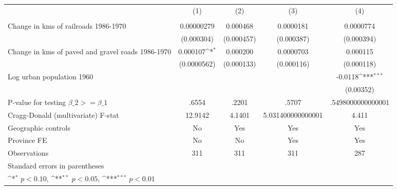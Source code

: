 {
\def\sym#1{\ifmmode^{#1}\else\(^{#1}\)\fi}
\begin{tabular}{l*{4}{c}}
\hline\hline
                &\multicolumn{1}{c}{(1)}&\multicolumn{1}{c}{(2)}&\multicolumn{1}{c}{(3)}&\multicolumn{1}{c}{(4)}\\
                &\multicolumn{1}{c}{}&\multicolumn{1}{c}{}&\multicolumn{1}{c}{}&\multicolumn{1}{c}{}\\
\hline
Change in kms of railroads 1986-1970&0.00000279         & 0.000468         &0.0000181         &0.0000774         \\
                &(0.000304)         &(0.000457)         &(0.000387)         &(0.000394)         \\
[1em]
Change in kms of paved and gravel roads 1986-1970& 0.000107\sym{*}  & 0.000200         &0.0000703         & 0.000115         \\
                &(0.0000562)         &(0.000133)         &(0.000116)         &(0.000118)         \\
[1em]
Log urban population 1960&                  &                  &                  &  -0.0118\sym{***}\\
                &                  &                  &                  &(0.00352)         \\
\hline
P-value for testing $\beta\_{2} >= \beta\_{1}$&    .6554         &    .2201         &    .5707         &.5498000000000001         \\
Cragg-Donald (multivariate) F-stat&  12.9142         &   4.1401         &5.031400000000001         &    4.411         \\
Geographic controls&       No         &      Yes         &      Yes         &      Yes         \\
Province FE     &       No         &       No         &      Yes         &      Yes         \\
Observations    &      311         &      311         &      311         &      287         \\
\hline\hline
\multicolumn{5}{l}{\footnotesize Standard errors in parentheses}\\
\multicolumn{5}{l}{\footnotesize \sym{*} \(p<0.10\), \sym{**} \(p<0.05\), \sym{***} \(p<0.01\)}\\
\end{tabular}
}
